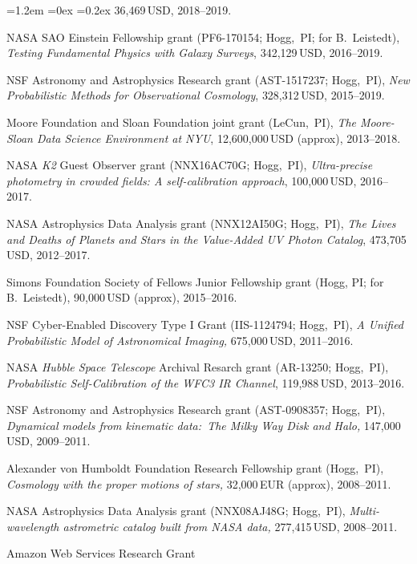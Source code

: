 \documentclass[10pt,letterpaper]{article}
\newcommand{\acronym}[1]{{\small{#1}}}
\newcommand{\project}[1]{\textsl{#1}}
\newcommand{\usd}[1]{{#1}\,\acronym{USD}}
\newcommand{\eur}[1]{{#1}\,\acronym{EUR}}
\newcommand{\grantnumber}[2]{{\footnotesize{#1}}; #2,~\acronym{PI}}
\newcounter{refpubnum}
\newcommand{\hogglist}{%
    \rightmargin=0in
    \leftmargin=1.2em
    \topsep=0ex
    \partopsep=0pt
    \itemsep=0.2ex
    \parsep=0pt
    \itemindent=-1.0\leftmargin
    \listparindent=0.0\leftmargin
    \settowidth{\labelsep}{~}
    \usecounter{refpubnum}
  }
\begin{document}
\begin{list}{}{\hogglist}
\usd{36,469}, 2018--2019.
\item
  \acronym{NASA} \acronym{SAO} Einstein Fellowship grant (\grantnumber{PF6-170154}{Hogg}; for B.~Leistedt),
  \textit{Testing Fundamental Physics with Galaxy Surveys},
  \usd{342,129}, 2016--2019.
\item
\acronym{NSF} Astronomy and Astrophysics Research grant
(\grantnumber{AST-1517237}{Hogg}),
\textit{New Probabilistic Methods for Observational Cosmology},
\usd{328,312}, 2015--2019.
\item
Moore Foundation and Sloan Foundation joint grant
(LeCun,~\acronym{PI}),
\textit{The Moore-Sloan Data Science Environment at \acronym{NYU}},
\usd{12,600,000} (approx), 2013--2018.
\item
\acronym{NASA} \project{\acronym{K2}} Guest Observer grant
(\grantnumber{NNX16AC70G}{Hogg}),
\textit{Ultra-precise photometry in crowded fields: A self-calibration approach},
\usd{100,000}, 2016--2017.
\item
\acronym{NASA} Astrophysics Data Analysis grant
(\grantnumber{NNX12AI50G}{Hogg}),
\textit{The Lives and Deaths of Planets and Stars in the Value-Added UV Photon Catalog},
\usd{473,705}, 2012--2017.
\item
  Simons Foundation Society of Fellows Junior Fellowship grant (Hogg, PI; for B.~Leistedt),
  \usd{90,000} (approx), 2015--2016.
\item
\acronym{NSF} Cyber-Enabled Discovery Type I Grant
(\grantnumber{IIS-1124794}{Hogg}),
\textit{A Unified Probabilistic Model of Astronomical Imaging,}
\usd{675,000}, 2011--2016.
\item
\acronym{NASA} \project{Hubble Space Telescope} Archival Resarch grant
(\grantnumber{AR-13250}{Hogg}),
\textit{Probabilistic Self-Calibration of the \acronym{WFC3} IR Channel},
\usd{119,988}, 2013--2016.
\item
\acronym{NSF} Astronomy and Astrophysics Research grant
(\grantnumber{AST-0908357}{Hogg}),
\textit{Dynamical models from kinematic data:\ The Milky Way Disk and Halo,}
\usd{147,000}, 2009--2011.
\item
Alexander von Humboldt Foundation Research Fellowship grant
(Hogg,~\acronym{PI}),
\textit{Cosmology with the proper motions of stars,}
\eur{32,000} (approx), 2008--2011.
\item
\acronym{NASA} Astrophysics Data Analysis grant
(\grantnumber{NNX08AJ48G}{Hogg}),
\textit{Multi-wavelength astrometric catalog built from \acronym{NASA} data,}
\usd{277,415}, 2008--2011.
\item
Amazon Web Services Research Grant

\end{list}
\end{document}
